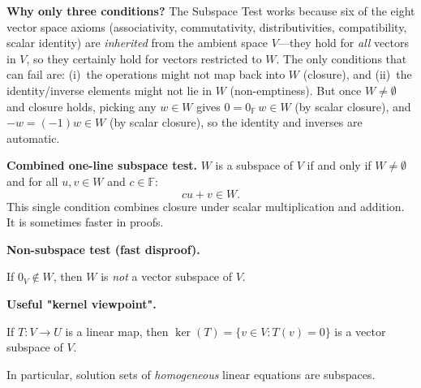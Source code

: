 \begin{policynote}
\textbf{Why only three conditions?}
The Subspace Test works because six of the eight vector space axioms (associativity, commutativity, distributivities, compatibility, scalar identity) are \emph{inherited} from the ambient space $V$---they hold for \emph{all} vectors in $V$, so they certainly hold for vectors restricted to $W$.
The only conditions that can fail are: (i)~the operations might not map back into $W$ (closure), and (ii)~the identity/inverse elements might not lie in $W$ (non-emptiness).
But once $W\neq\emptyset$ and closure holds, picking any $w\in W$ gives $0=0_{\mathbb{F}}\,w\in W$ (by scalar closure), and $-w=(-1)w\in W$ (by scalar closure), so the identity and inverses are automatic.
\end{policynote}

\begin{keyformula}
\textbf{Combined one-line subspace test.}
$W$ is a subspace of $V$ if and only if $W\neq\emptyset$ and for all $u,v\in W$ and $c\in\mathbb{F}$:
\[
cu+v\in W.
\]
This single condition combines closure under scalar multiplication and addition.  It is sometimes faster in proofs.
\end{keyformula}

\begin{keyformula}

\textbf{Non-subspace test (fast disproof).}

If $0_V\notin W$, then $W$ is \emph{not} a vector subspace of $V$.

\medskip

\textbf{Useful "kernel viewpoint".}

If $T:V\to U$ is a linear map, then $\ker(T)=\{v\in V:T(v)=0\}$ is a vector subspace of $V$.

In particular, solution sets of \emph{homogeneous} linear equations are subspaces.

\end{keyformula}

